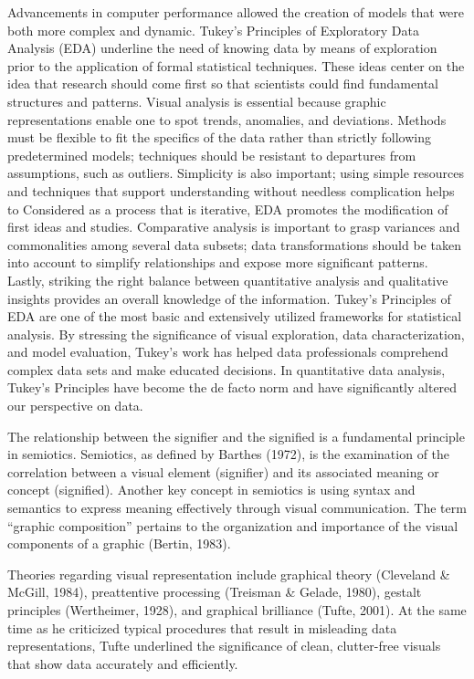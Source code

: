 \documentclass[print]{nuthesis}
\begin{document}
Advancements in computer performance allowed the creation of models that were both more complex and dynamic.
Tukey's Principles of Exploratory Data Analysis (EDA) underline the need of knowing data by means of exploration prior to the application of formal statistical techniques.
These ideas center on the idea that research should come first so that scientists could find fundamental structures and patterns. Visual analysis is essential because graphic representations enable one to spot trends, anomalies, and deviations.
Methods must be flexible to fit the specifics of the data rather than strictly following predetermined models; techniques should be resistant to departures from assumptions, such as outliers.
Simplicity is also important; using simple resources and techniques that support understanding without needless complication helps to Considered as a process that is iterative, EDA promotes the modification of first ideas and studies.
Comparative analysis is important to grasp variances and commonalities among several data subsets; data transformations should be taken into account to simplify relationships and expose more significant patterns.
Lastly, striking the right balance between quantitative analysis and qualitative insights provides an overall knowledge of the information.
Tukey's Principles of EDA are one of the most basic and extensively utilized frameworks for statistical analysis.
By stressing the significance of visual exploration, data characterization, and model evaluation, Tukey's work has helped data professionals comprehend complex data sets and make educated decisions.
In quantitative data analysis, Tukey's Principles have become the de facto norm and have significantly altered our perspective on data.

The relationship between the signifier and the signified is a fundamental principle in semiotics. Semiotics, as defined by Barthes (1972), is the examination of the correlation between a visual element (signifier) and its associated meaning or concept (signified).
Another key concept in semiotics is using syntax and semantics to express meaning effectively through visual communication.
The term ``graphic composition'' pertains to the organization and importance of the visual components of a graphic (Bertin, 1983).

Theories regarding visual representation include graphical theory (Cleveland \& McGill, 1984), preattentive processing (Treisman \& Gelade, 1980), gestalt principles (Wertheimer, 1928), and graphical brilliance (Tufte, 2001).
At the same time as he criticized typical procedures that result in misleading data representations, Tufte underlined the significance of clean, clutter-free visuals that show data accurately and efficiently.
\end{document}

